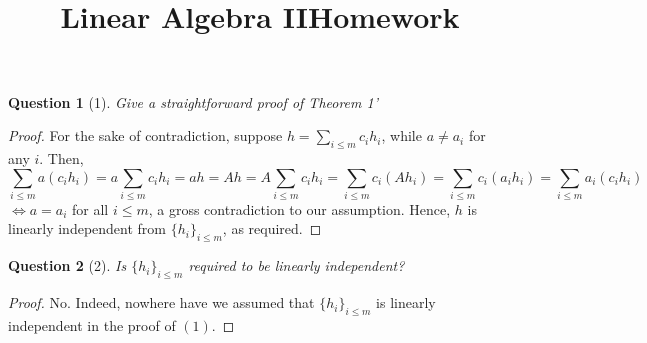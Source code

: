 \documentclass[11pt]{article}
\title{\vspace{-50pt}
\Huge \name
\\\vspace{20pt}
\huge Linear Algebra II\hfill Homework \hw}
\author{}
\date{}
\theoremstyle{quest}
\newtheorem*{question}{Question}
\begin{document}
\maketitle

\begin{question}[1]
Give a straightforward proof of Theorem 1'
\end{question}
\begin{proof}
  For the sake of contradiction, suppose $h = \sum_{i \le m} c_i h_i$, while $a \ne a_i$ for any $i$. Then,
  $$\sum_{i \le m} a (c_i h_i) = a \sum_{i \le m} c_i h_i = ah = Ah = A \sum_{i \le m} c_i h_i = \sum_{i \le m} c_i (A h_i) = \sum_{i \le m} c_i (a_i h_i) = \sum_{i \le m} a_i (c_i h_i)$$ $\iff a = a_i$ for all $i \le m$, a gross contradiction to our assumption. Hence, $h$ is linearly independent from $\{h_i\}_{i \le m}$, as required.
\end{proof}

\begin{question}[2]
Is $\{h_i\}_{i \le m}$ required to be linearly independent?
\end{question}
\begin{proof}
  No. Indeed, nowhere have we assumed that $\{h_i\}_{i \le m}$ is linearly independent in the proof of $(1)$.
\end{proof}
\end{document}

